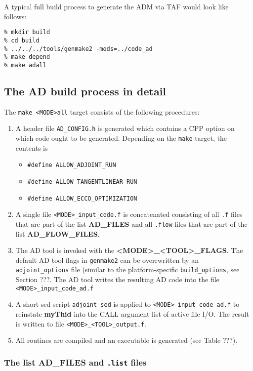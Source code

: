 A typical full build process to generate the ADM via TAF would
look like follows:
\begin{verbatim}
% mkdir build
% cd build
% ../../../tools/genmake2 -mods=../code_ad
% make depend
% make adall
\end{verbatim}


\subsection{The AD build process in detail
\label{section_ad_build_detail}}

The {\tt make <MODE>all} target consists of the following procedures:

\begin{enumerate}
%
\item
A header file {\tt AD\_CONFIG.h} is generated which contains a CPP option
on which code ought to be generated. Depending on the {\tt make} target,
the contents is
\begin{itemize}
\item
{\tt \#define ALLOW\_ADJOINT\_RUN}
\item
{\tt \#define ALLOW\_TANGENTLINEAR\_RUN}
\item
{\tt \#define ALLOW\_ECCO\_OPTIMIZATION}
\end{itemize}
%
\item
A single file {\tt <MODE>\_input\_code.f} is concatenated 
consisting of all {\tt .f} files that are part of the list {\bf AD\_FILES} 
and all {\tt .flow} files that are part of the list {\bf AD\_FLOW\_FILES}.
%
\item
The AD tool is invoked with the {\bf <MODE>\_<TOOL>\_FLAGS}.
The default AD tool flags in {\tt genmake2} can be overrwritten by
an {\tt adjoint\_options} file (similar to the platform-specific
{\tt build\_options}, see Section ???.
The AD tool writes the resulting AD code into the file
{\tt <MODE>\_input\_code\_ad.f}
%
\item
A short sed script {\tt adjoint\_sed} is applied to 
{\tt <MODE>\_input\_code\_ad.f}
to reinstate {\bf myThid} into the CALL argument list of active file I/O.
The result is written to file {\tt <MODE>\_<TOOL>\_output.f}.
%
\item
All routines are compiled and an executable is generated
(see Table ???).
%
\end{enumerate}

\subsubsection{The list AD\_FILES and {\tt .list} files}

